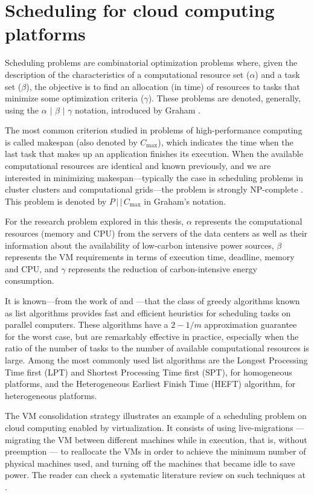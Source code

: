 \section{Scheduling for cloud computing platforms}
\label{sec:scheduling_cloud}

Scheduling problems are combinatorial optimization problems where, given the description of the characteristics of a computational resource set ($\alpha$) and a task set ($\beta$), the objective is to find an allocation (in time) of resources to tasks that minimize some optimization criteria ($\gamma$). These problems are denoted, generally, using the $\alpha$ $\vert$ $\beta$ $\vert$ $\gamma$ notation, introduced by Graham \citep{graham}. 

The most common criterion studied in problems of high-performance computing is called makespan (also denoted by $C_{\max}$), which indicates the time when the last task that makes up an application finishes its execution. When the available computational resources are identical and known previously, and we are interested in minimizing makespan---typically the case in scheduling problems in cluster clusters and computational grids---the problem is strongly NP-complete \citep{Garey}. This problem is denoted by $P\,\vert\,\vert\,C_{\max}$ in Graham's notation.

For the research problem explored in this thesis, $\alpha$ represents the computational resources (memory and CPU) from the servers of the data centers as well as their information about the availability of low-carbon intensive power sources, $\beta$ represents the VM requirements in terms of execution time,  deadline, memory and CPU, and $\gamma$ represents the reduction of carbon-intensive energy consumption.

It is known---from the work of \citet {graham} and \citet {Garey}---that the class of greedy algorithms known as list algorithms provides fast and efficient heuristics for scheduling tasks on parallel computers. These algorithms have a $2 -1 /m$ approximation guarantee for the worst case, but are remarkably effective in practice, especially when the ratio of the number of tasks to the number of available computational resources is large. Among the most commonly used list algorithms are the Longest Processing Time first (LPT) and Shortest Processing Time first (SPT),  for homogeneous platforms, and the Heterogeneous Earliest Finish Time (HEFT) algorithm, for heterogeneous platforms.

The VM consolidation strategy illustrates an example of a scheduling problem on cloud computing enabled by virtualization. It consists of using live-migrations --- migrating the VM between different machines while in execution, that is, without preemption --- to reallocate the VMs in order to achieve the minimum number of physical machines used, and turning off the machines that became idle to save power. The reader can check a systematic literature review on such techniques at \cite{10.1145/3470972}.


